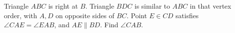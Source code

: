 Triangle $ABC$ is right at $B$. Triangle $BDC$ is similar to $ABC$ in that vertex order, with $A,D$ on opposite sides of $BC$. Point $E\in CD$ satisfies $\angle CAE=\angle EAB$, and $AE\parallel BD$. Find $\angle CAB$.
